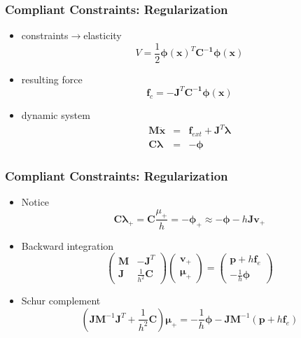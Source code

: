 \documentclass[serif,mathserif]{beamer}
\newcommand{\BOLD}[1]{\mathbf{#1}}
\begin{document}
\begin{frame}
 \frametitle{Compliant Constraints: Regularization}
 \begin{itemize}
  \item constraints$\rightarrow$elasticity
  \begin{equation*}
   V=\frac{1}{2}\BOLD{\phi(x)}^T\BOLD{C^{-1}\phi(x)}
  \end{equation*}
  \item resulting force
  \begin{equation*}
   \BOLD{f}_c = -\BOLD{J}^T\BOLD{C^{-1}\phi(x)}
  \end{equation*}
  \pause
  \pause
  \item dynamic system
  \begin{eqnarray*}
    \BOLD{M\ddot{x}} &=& \BOLD{f}_{ext}+\BOLD{J}^T\BOLD{\lambda} \\
    \BOLD{C\lambda} &=& -\BOLD{\phi}
  \end{eqnarray*}
 \end{itemize}
\end{frame}

\begin{frame}
 \frametitle{Compliant Constraints: Regularization}
 \begin{itemize}
  \item Notice
  \begin{equation*}
   \BOLD{C\lambda}_+ = \BOLD{C}\frac{\mu_+}{h}=-\BOLD{\BOLD{\phi}}_+\approx-\BOLD{\phi}-h\BOLD{Jv}_+
  \end{equation*}
  \item Backward integration
    \begin{equation*}
     \begin{pmatrix}
      \BOLD{M} & -\BOLD{J}^T \\
      \BOLD{J} & \frac{1}{h^2}\BOLD{C}
     \end{pmatrix}
     \begin{pmatrix}
      \BOLD{v}_+ \\ \BOLD{\mu}_+
     \end{pmatrix}
     =
     \begin{pmatrix}
      \BOLD{p}+h\BOLD{f}_e \\ -\frac{1}{h}\BOLD{\phi}
     \end{pmatrix}
    \end{equation*}
  \item Schur complement
    \begin{equation*}
      (\BOLD{JM}^{-1}\BOLD{J}^T + \frac{1}{h^2}\BOLD{C})\BOLD{\mu}_+ = -\frac{1}{h}\BOLD{\phi}-\BOLD{JM}^{-1}(\BOLD{p}+h\BOLD{f}_e)
    \end{equation*}
 \end{itemize}

\end{frame}
\end{document}
